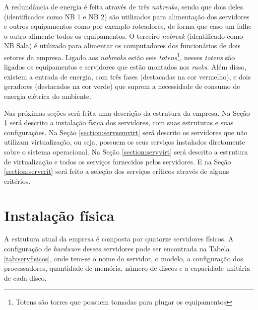 A redundância de energia é feita através de três \textit{nobreaks}, sendo que dois deles (identificados como NB 1 e NB 2) são utilizados para 
alimentação dos servidores e outros equipamentos como por exemplo roteadores, de forma que caso um falhe o outro alimente todos os equipamentos. 
O terceiro \textit{nobreak} (identificado como NB Sala) é utilizado para alimentar os computadores dos funcionários de dois setores da empresa. 
Ligado aos \textit{nobreaks} estão seis \textit{totens}\footnote[1]{Totens são torres que possuem tomadas para plugar os equipamentos},
nesses \textit{totens} são ligados os equipamentos e servidores que estão montados nos \textit{racks}. 
Além disso, existem a entrada de energia, com três fases (destacadas na cor vermelho), e dois geradores (destacados na cor verde) que suprem a 
necessidade de consumo de energia elétrica do ambiente.

Nas próximas seções será feita uma descrição da estrutura da empresa. Na Seção \ref{section:fisico} será descrito a instalação física dos 
servidores, com suas estruturas e suas configurações. Na Seção \ref{section:servsemvirt} será descrito os servidores que não utilizam virtualização,
ou seja, possuem os seus serviços instalados diretamente sobre o sistema operacional.
Na Seção \ref{section:servvirt} será descrito a estrutura de virtualização e todos os serviços fornecidos pelos servidores. 
E na Seção \ref{section:servcrit} será feito a seleção dos serviços críticos através de alguns critérios.

\section{Instalação física}
\label{section:fisico}

A estrutura atual da empresa é composta por quatorze servidores físicos. 
A configuração de \textit{hardware} desses servidores pode ser encontrada na Tabela \ref{tab:servfisicos}, onde tem-se o nome do servidor, 
o modelo, a configuração dos processadores, quantidade de memória, número de discos e a capacidade unitária de cada disco.

